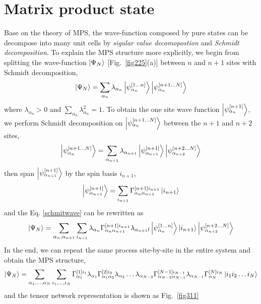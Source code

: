 \section{Matrix product state}
\label{MPS}

Base on the theory of MPS, the wave-function composed by pure states can be decompose into many unit cells by \textit{sigular value decomopostion} and \textit{Schmidt decomposition}. To explain the MPS structure more explicitly, we begin from splitting the wave-function $\Ket{\Psi_N}$ [Fig.~\ref{fig225}(a)] between $n$ and $n+1$ sites with Schmidt decomposition, 
\begin{align}
	\label{schmitwave}
	\Ket{\Psi_{N}} = \sum_{\alpha_n} \lambda_{\alpha_n} \Ket{\psi_{\alpha_n}^{[1\dots n]}} \Ket{\psi_{\alpha_n}^{[n+1\dots N]}}
\end{align}
where $\lambda_{\alpha_n} > 0$ and $\sum\limits_{\alpha_n}{\lambda_{\alpha_n}^2 = 1}$. To obtain the one site wave function $\Ket{\psi_{\alpha_n}^{[n+1]}}$, we perform Schmidt decomposition on $\Ket{\psi_{\alpha_n}^{[n+1\dots N]}}$ between the $n+1$ and $n+2$ sites,
\begin{align}
	\Ket{\psi_{\alpha_n}^{[n+1\dots N]}} = \sum_{\alpha_{n+1}} \lambda_{\alpha_{n+1}} \Ket{\psi_{\alpha_{n+1}}^{[n+1]}} \Ket{\psi_{\alpha_{n+2}}^{[n+2\dots N]}}
\end{align}
then span $\Ket{\psi_{\alpha_{n+1}}^{[n+1]}}$ by the spin basis $i_{n+1}$,
\begin{align}
	\Ket{\psi_{\alpha_{n+1}}^{[n+1]}} = \sum_{i_{n+1}}{\Gamma^{[n+1] i_{n+1}}_{\alpha_n \alpha_{n+1}} \Ket{i_{n+1}}}
\end{align}
and the Eq. \ref{schmitwave} can be rewritten as
\begin{align}
	\Ket{\Psi_{N}} = \sum_{\alpha_n,\alpha_{n+1}}\sum_{i_{n+1}}{\lambda_{\alpha_n} \Gamma^{[n+1] i_{n+1}}_{\alpha_n \alpha_{n+1}} \lambda_{\alpha_{n+1}l} \Ket{\psi_{\alpha_n}^{[1\dots n]}} \Ket{i_{n+1}} \Ket{\psi_{\alpha_{n+2}}^{[n+2\dots N]}} }
\end{align}
In the end, we can repeat the same process site-by-site in the entire system and obtain the MPS structure,
\begin{align}
	\Ket{\Psi_N} = \sum_{\alpha_1,\dots ,\alpha_N}\sum_{i_1,\dots ,i_N}{ \Gamma^{[1] i_{1}}_{\alpha_1} \lambda_{\alpha_1} \Gamma^{[2] i_{2}}_{\alpha_1 \alpha_{2}} \lambda_{\alpha_2} \dots  \lambda_{\alpha_{N-2}} \Gamma^{[N-1] i_{N-1}}_{\alpha_{N-2} \alpha_{N-1}} \lambda_{\alpha_{N-1}} \Gamma^{[N] i_{N}}_{\alpha_{N}} \Ket{i_1 i_2 \dots i_N}}
\end{align}
and the tensor network representation is shown as Fig.~\ref{fig311}

